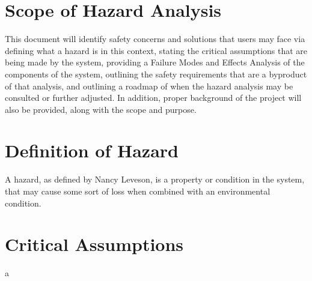 \documentclass[12pt]{article}
\begin{document}
\section{Scope of Hazard Analysis}
This document will identify safety concerns and solutions that users may face via defining what a hazard is in this context, stating the critical assumptions that are being made by the system, providing a Failure Modes and Effects Analysis of the components of the system, outlining the safety requirements that are a byproduct of that analysis, and outlining a roadmap of when the hazard analysis may be consulted or further adjusted. In addition, proper background of the project will also be provided, along with the scope and purpose.

\section{Definition of Hazard}
A hazard, as defined by Nancy Leveson, is a property or condition in the system, that may cause some sort of loss when combined with an environmental condition.

\section{Critical Assumptions}
a
\end{document}
